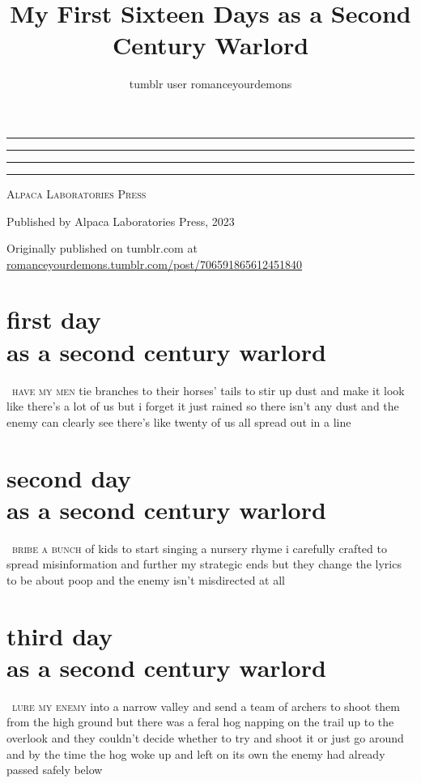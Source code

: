 \documentclass[smalldemyvopaper,11pt,twoside,onecolumn,openany,extrafontsizes]{memoir}
\title{My First Sixteen Days as a Second Century Warlord}
\author{tumblr user romanceyourdemons}
\newcommand{\press}{Alpaca Laboratories Press}
\newcommand*\halftitlepage{\begingroup %
  \setlength\drop{0.1\textheight}
  \begin{center}
  \vspace*{\drop}
  \rule{\textwidth}{0in}\par
  {\Large\thetitle\par}
  \rule{\textwidth}{0in}\par
  \vfill
  \end{center}
\endgroup}
\newlength\drop
\newcommand*\titleM{\begingroup %
  \setlength\drop{0.15\textheight}
  \begin{center}
  \vspace*{\drop}
  \rule{\textwidth}{0in}\par
  {\HUGE\thetitle\par}
  \rule{\textwidth}{0in}\par
  {\Large\textit\theauthor\par}
  \vfill
  {\Large\scshape\press}
  \end{center}
\endgroup}
\begin{document}
\pagestyle{empty}
\halftitlepage
\cleardoublepage
\titleM
\clearpage
\begin{center}
\vfill
Published by \press, 2023
\end{center}

\medskip

Originally published on tumblr.com at \\
\url{romanceyourdemons.tumblr.com/post/706591865612451840}

\vfill
\clearpage

\frontmatter
\pagestyle{mystyle}
\tableofcontents*
\mainmatter

\chapter{first day\\as a second century warlord}

\lettrine[lhang=0.2,lines=3,findent=2pt]{}{\, have my men} tie branches to their
horses' tails to stir up dust and make it look like there's a lot of us but i
forget it just rained so there isn't any dust and the enemy can clearly see
there's like twenty of us all spread out in a line

\chapter{second day\\as a second century warlord}

\lettrine[lhang=0.2,lines=3,findent=2pt]{}{\, bribe a bunch} of kids to start
singing a nursery rhyme i carefully crafted to spread misinformation and further
my strategic ends but they change the lyrics to be about poop and the enemy
isn't misdirected at all

\chapter{third day\\as a second century warlord}

\lettrine[lhang=0.2,lines=3,findent=2pt]{}{\, lure my enemy} into a narrow
valley and send a team of archers to shoot them from the high ground but there
was a feral hog napping on the trail up to the overlook and they couldn't
decide whether to try and shoot it or just go around and by the time the hog
woke up and left on its own the enemy had already passed safely below
\end{document}
